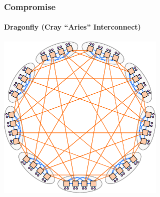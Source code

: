 \documentclass[xcolor={rgb,x11names,svgnames},rgb,x11names,svgnames]{beamer}
\begin{document}
\begin{frame}
  \frametitle{Compromise}
  \framesubtitle{Dragonfly (Cray ``Aries'' Interconnect)}

  \centering
  \includegraphics[height=8cm]{dragonfly.pdf}
\end{frame}



\end{document}
